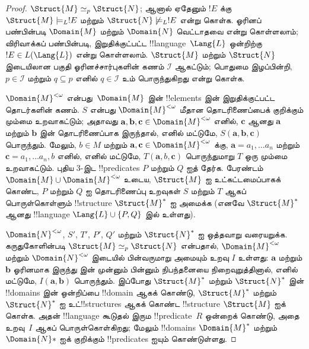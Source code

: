 \documentclass[../../../include/open-logic-section]{subfiles}
\begin{document}
\begin{proof}
$\Struct{M} \simeq_p \Struct{N}$; ஆனால் ஏதேனும் $!E$ க்கு
$\Struct{M} \models_L !E$ மற்றும் $\Struct{N} \not\models_L !E$
என்று கொள்க. ஓரினப் பண்பின்படி $\Domain{M}$ மற்றும் $\Domain{N}$
வெட்டாதவை என்று கொள்ளலாம்; விரிவாக்கப் பண்பின்படி,
இறுதிக்குட்பட்ட !!{language}~$\Lang{L}$ ஒன்றிற்கு
$!E \in L(\Lang{L})$ என்று கொள்ளலாம். $\Struct{M}$ மற்றும்
$\Struct{N}$ இடையிலான பகுதி ஓரினச்சார்புகளின் கணம்
$\mathcal{I}$ ஆகட்டும்; பொதுமை இழப்பின்றி, $p
\in \mathcal{I}$ மற்றும் $q \subseteq p$ எனில்
$q \in \mathcal{I}$ உம் பொருந்துகிறது என்று கொள்க.

$\Domain{M}^{<\omega}$ என்பது~$\Domain{M}$ இன் !!{element}s இன்
இறுதிக்குட்பட்ட தொடர்களின் கணம். $S$ என்பது
$\Domain{M}^{<\omega}$ மீதான தொடரிணைப்பைக் குறிக்கும் மும்மை உறவாகட்டும்;
அதாவது $\mathbf{a}, \mathbf{b},
\mathbf{c} \in \Domain{M}^{<\omega}$ எனில், $\mathbf{c}$ ஆனது
$\mathbf{a}$ மற்றும் $\mathbf{b}$ இன் தொடரிணைப்பாக இருந்தால், எனில்
மட்டுமே, $S(\mathbf{a}, \mathbf{b},
\mathbf{c})$ பொருந்தும். மேலும், $b \in M$ மற்றும்
$\mathbf{a}, \mathbf{c} \in \Domain{M}^{<\omega}$ க்கு,
$\mathbf{a} =
a_1, \dots a_n$ மற்றும் $\mathbf{c} = a_1, \dots a_n, b$ எனில்,
எனில் மட்டுமே, $T(\mathbf{a}, b, \mathbf{c})$ பொருந்துமாறு
$T$ ஒரு மும்மை உறவாகட்டும். புதிய 3-இட !!{predicate}s $P$ மற்றும்
$Q$ ஐத் தேர்க. பேரண்டம் $\Domain{M} \cup \Domain{M}^{<\omega}$ உடைய,
$\Struct{M}$ ஐ உட்கட்டமைப்பாகக் கொண்ட, $P$ மற்றும் $Q$ ஐ
தொடரிணைப்பு உறவுகள் $S$ மற்றும் $T$ ஆகப் பொருள்கொள்ளும்
!!{structure} $\Struct{M}^*$ ஐ அமைக்க (எனவே $\Struct{M}^*$ ஆனது
!!{language} $\Lang{L} \cup \{ P, Q\}$ இல் உள்ளது).

$\Domain{N}^{<\omega}$, $S'$, $T'$, $P'$, $Q'$ மற்றும்
$\Struct{N}^*$ ஐ ஒத்தவாறு வரையறுக்க. கருதுகோளின்படி
$\Struct{M} \simeq_p
\Struct{N}$ என்பதால், $\Domain{M}^{<\omega}$ மற்றும்
$\Domain{N}^{<\omega}$ இடையில் பின்வருமாறு அமையும் உறவு $I$ உள்ளது:
$\mathbf{a}$ மற்றும் $\mathbf{b}$ ஓரினமாக இருந்து
 இன் முன்னும் பின்னும் நிபந்தனையை
நிறைவுறுத்தினால், எனில் மட்டுமே, $I(\mathbf{a}, \mathbf{b})$
பொருந்தும். இப்போது $\Struct{M}^*$ மற்றும் $\Struct{N}^*$ இன்
!!{domain}s இன் ஒன்றிப்பை !!{domain} ஆகக் கொண்டு,
$\Struct{M}^*$ மற்றும் $\Struct{N}^*$ ஐ உட்!!{structure}s ஆகக் கொண்ட
!!{structure} $\Struct{M}$ ஐக் கொள்க.
அதன் !!{language} கூடுதல் இரும !!{predicate}~$R$ ஒன்றைக் கொண்டு,
அதை உறவு~$I$ ஆகப் பொருள்கொள்கிறது; மேலும் !!{domain}s
$\Domain{M}^*$ மற்றும்~$\Domain{N}*$ ஐக் குறிக்கும் !!{predicate}s
ஐயும் கொண்டுள்ளது.


\end{proof}
\end{document}
